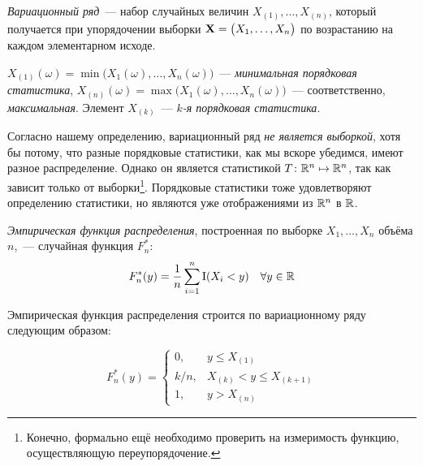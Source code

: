 \begin{defn}
    \textit{Вариационный ряд}~--- набор случайных величин $X_{(1)}, \ldots, X_{(n)}$, который получается при упорядочении выборки $\mathbf{X}= \bigl(X_1, \ldots, X_n \bigr)$ по возрастанию на каждом элементарном исходе. 

    $X_{(1)}(\omega)=\min \bigl(X_{1}(\omega), \ldots, X_{n}(\omega)\bigr)$~--- \textit{минимальная порядковая статистика}, 
    $X_{(n)}(\omega)=\max \bigl(X_{1}(\omega), \ldots, X_{n}(\omega)\bigr)$~--- соответственно, \textit{максимальная}.
    Элемент $X_{(k)}$~--- \textit{$k$-я порядковая статистика}. 
\end{defn}

\begin{rmrk}
    Согласно нашему определению, вариационный ряд \textit{не является выборкой}, хотя бы потому, что разные порядковые статистики, как мы вскоре убедимся, имеют разное распределение.
    Однако он является статистикой $T\colon \mathbb{R}^n \mapsto \mathbb{R}^n$, так как зависит только от выборки\footnote{Конечно, формально ещё необходимо проверить на измеримость функцию, осуществляющую переупорядочение.}.
    Порядковые статистики тоже удовлетворяют определению статистики, но являются уже отображениями из $\mathbb{R}^n$ в $\mathbb{R}$.
\end{rmrk}

\begin{defn}
    \textit{Эмпирическая функция распределения}, построенная по выборке $X_{1}, \ldots, X_{n}$ объёма $n$,~--- случайная функция $F_{n}^{*}$:
    \begin{equation*}
        F_{n}^{*}(y) =\frac{1}{n} \sum\limits_{i=1}^{n} \operatorname{\mathrm{I}}(X_{i}<y) \quad \forall y \in \mathbb{R}
    \end{equation*}
\end{defn}

Эмпирическая функция распределения строится по вариационному ряду следующим образом:

\begin{equation*}
    F_{n}^{*}(y)=\left\{\begin{array}{ll}
    0,   & y \leqslant X_{(1)} \\
    k/n, & X_{(k)} < y \leqslant X_{(k+1)} \\
    1,   & y > X_{(n)}
    \end{array}\right.
\end{equation*}

